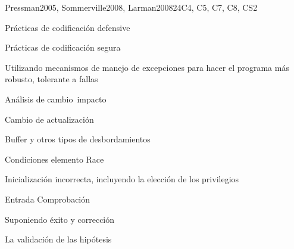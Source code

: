 \begin{syllabus}
\begin{unit}{\SESoftwareConstruction}{}{Pressman2005, Sommerville2008, Larman2008}{24}{C4, C5, C7, C8, CS2}
	\begin{topics}
		\item \SESoftwareConstructionTopicCoding
		\begin{subtopic}
			\item Prácticas de codificación defensive
			\item Prácticas de codificación segura
			\item Utilizando mecanismos de manejo de excepciones para hacer el programa más robusto, tolerante a fallas
		\end{subtopic}
		\item \SESoftwareConstructionTopicCodingStandards
		\item \SESoftwareConstructionTopicIntegration
		\item \SESoftwareConstructionTopicDevelopment
		\begin{subtopic} 
			\item Análisis de cambio impacto 
			\item Cambio de actualización 
		\end{subtopic}
		\item \SESoftwareConstructionTopicPotential
		\begin{subtopic} 
			\item Buffer y otros tipos de desbordamientos 
			\item Condiciones elemento Race 
			\item Inicialización incorrecta, incluyendo la elección de los privilegios 
			\item Entrada Comprobación 
			\item Suponiendo éxito y corrección 
			\item La validación de las hipótesis 
		\end{subtopic}
	\end{topics}
	\begin{learningoutcomes}
		\item \SESoftwareConstructionLODescribeTechniques[\Assessment]
		\item \SESoftwareConstructionLOBuild[\Assessment]
		\item \SESoftwareConstructionLODescribeSecure[\Assessment]
		\item \SESoftwareConstructionLOSelectAndDefined[\Assessment]
		\item \SESoftwareConstructionLOCompareAndStrategies[\Assessment]
		\item \SESoftwareConstructionLODescribeTheAnalyzing[\Assessment]
		\item \SESoftwareConstructionLODescribeTheAnalyzingChanges[\Assessment]
		\item \SESoftwareConstructionLORewrite[\Assessment]
		\item \SESoftwareConstructionLOWriteAThatNon[\Assessment]
	\end{learningoutcomes}
\end{unit}



\begin{coursebibliography}
\end{coursebibliography}

\end{syllabus}

%
